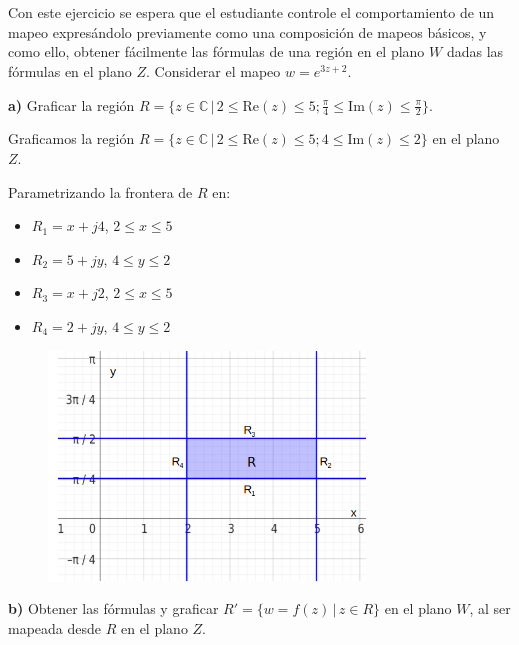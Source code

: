 \documentclass[12pt,a4paper]{report}
\begin{document}
\clearpage

\chapter{}%

Con este ejercicio se espera que el estudiante controle el comportamiento de un mapeo expresándolo previamente como una composición de mapeos básicos, y como ello, obtener fácilmente las fórmulas de una región en el plano $W$ dadas las fórmulas en el plano $Z$. Considerar el mapeo $w = e^{3z + 2}$.

\textbf{a)} Graficar la región $R = \{z \in \mathbb{C} \, | \, 2 \leq \text{Re}(z) \leq 5; \frac{\pi}{4} \leq \text{Im}(z) \leq \frac{\pi}{2}\}$.

Graficamos la región $R = \{z \in \mathbb{C} \, | \, 2 \leq \text{Re}(z) \leq 5; 4 \leq \text{Im}(z) \leq 2\}$ en el plano $Z$.

Parametrizando la frontera de $R$ en:
\begin{itemize}
    \item $R_1 = x + j4$, $2 \leq x \leq 5$
    \item $R_2 = 5 + jy$, $4 \leq y \leq 2$
    \item $R_3 = x + j2$, $2 \leq x \leq 5$
    \item $R_4 = 2 + jy$, $4 \leq y \leq 2$
\end{itemize}


\begin{figure}[h] %
    \centering %
    \includegraphics[width=0.75\textwidth]{./Imagenes/foto1Ej4.png} %
\end{figure}

\textbf{b)} Obtener las fórmulas y graficar $R' = \{w = f(z) \, | \, z \in R\}$ en el plano $W$, al ser mapeada desde $R$ en el plano $Z$.
\end{document}
